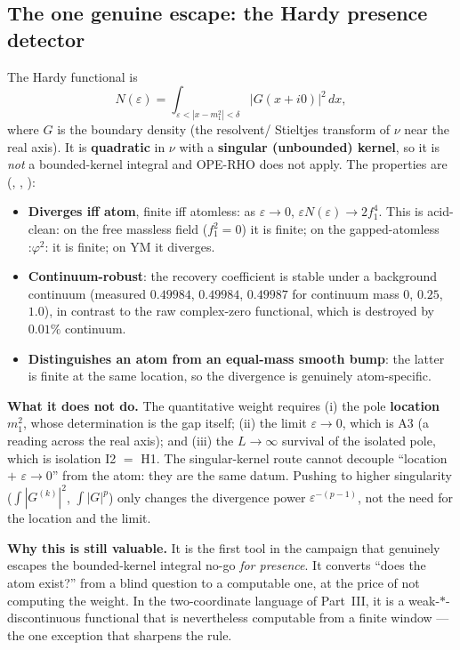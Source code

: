 \subsection{The one genuine escape: the Hardy presence detector}
\label{sec:hardy}

The Hardy functional is
\begin{equation}
N(\varepsilon)=\int_{\varepsilon<|x-m_1^2|<\delta}\bigl|G(x+i0)\bigr|^2\,dx ,
\label{eq:hardy}
\end{equation}
where $G$ is the boundary density (the resolvent/ Stieltjes transform of $\nu$ near the real
axis). It is \textbf{quadratic} in $\nu$ with a \textbf{singular (unbounded) kernel}, so it is
\emph{not} a bounded-kernel integral and OPE-RHO does not apply. The properties are
(, , ):

\begin{itemize}
\item \textbf{Diverges iff atom}, finite iff atomless: as $\varepsilon\to0$,
  $\varepsilon N(\varepsilon)\to2f_1^4$. This is acid-clean: on the free massless field
  ($f_1^2=0$) it is finite; on the gapped-atomless $\mathord{:}\varphi^2\mathord{:}$ it is
  finite; on YM it diverges.
\item \textbf{Continuum-robust}: the recovery coefficient is stable under a background continuum
  (measured $0.49984$, $0.49984$, $0.49987$ for continuum mass $0$, $0.25$, $1.0$), in contrast
  to the raw complex-zero functional, which is destroyed by $0.01\%$ continuum.
\item \textbf{Distinguishes an atom from an equal-mass smooth bump}: the latter is finite at the
  same location, so the divergence is genuinely atom-specific.
\end{itemize}

\textbf{What it does not do.} The quantitative weight requires (i) the pole \textbf{location}
$m_1^2$, whose determination is the gap itself; (ii) the limit $\varepsilon\to0$, which is A3
(a reading across the real axis); and (iii) the $L\to\infty$ survival of the isolated pole, which
is isolation I2 $=$ H1. The singular-kernel route cannot decouple ``location $+$ $\varepsilon\to0$''
from the atom: they are the same datum. Pushing to higher singularity
($\int|G^{(k)}|^2$, $\int|G|^p$) only changes the divergence power $\varepsilon^{-(p-1)}$, not
the need for the location and the limit.

\textbf{Why this is still valuable.} It is the first tool in the campaign that genuinely escapes
the bounded-kernel integral no-go \emph{for presence}. It converts ``does the atom exist?'' from
a blind question to a computable one, at the price of not computing the weight. In the
two-coordinate language of Part~III, it is a weak-$*$-discontinuous functional that is
nevertheless computable from a finite window --- the one exception that sharpens the rule.

